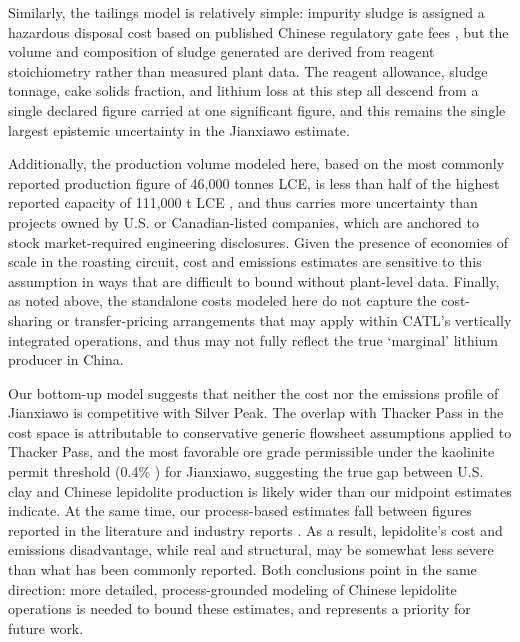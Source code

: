 \documentclass{article}
\renewcommand\_{\textunderscore\allowbreak}
\begin{document}
Similarly, the tailings model is relatively simple: impurity sludge is assigned a hazardous disposal cost based on published Chinese regulatory gate fees \cite{nationaldevelopmentandreformcommission2024}, but the volume and composition of sludge generated are derived from reagent
stoichiometry rather than measured plant data. The reagent allowance, sludge
tonnage, cake solids fraction, and lithium loss at this step all descend from a single declared figure carried at one significant figure, and this remains the single largest epistemic uncertainty in the Jianxiawo estimate.

Additionally, the production volume modeled here, based on the most commonly reported production figure of 46,000 tonnes LCE, is less than half of the highest reported capacity of 111,000 t LCE \cite{benchmarkteamRestartCATLsJianxiawo2026, andrezejewskiResourcesEnergyQuarterly2025}, and thus carries more uncertainty than projects owned by U.S. or Canadian-listed companies, which are anchored to stock market-required engineering disclosures. Given the presence of economies of scale in the roasting circuit, cost and emissions estimates are sensitive to this assumption in ways that are difficult to bound without plant-level data. Finally, as noted above, the standalone costs modeled here do not capture the cost-sharing or transfer-pricing arrangements that may apply within CATL's vertically integrated operations, and thus may not fully reflect the true `marginal' lithium producer in China.

Our bottom-up model suggests that neither the cost nor the emissions profile of Jianxiawo is competitive with Silver Peak. The overlap with Thacker Pass in the cost space is attributable to conservative generic flowsheet assumptions applied to Thacker Pass, and the most favorable ore grade permissible under the kaolinite permit threshold (0.4\% ) for Jianxiawo, suggesting the true gap between U.S. clay and Chinese lepidolite production is likely wider than our midpoint estimates indicate. At the same time, our process-based estimates fall between figures reported in the literature and industry reports \cite{gaoLithiumExtractionHard2023, atkinsonLithiumPriceReversion2023, liuChinaLithiumBoom2024}. As a result, lepidolite's cost and emissions disadvantage, while real and structural, may be somewhat less severe than what has been commonly reported. Both conclusions point in the same direction: more detailed, process-grounded modeling of Chinese lepidolite operations is needed to bound these estimates, and represents a priority for future work.
\end{document}
